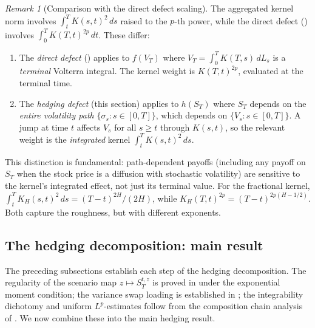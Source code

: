 \documentclass[11pt,a4paper]{article}
\theoremstyle{plain}
\theoremstyle{definition}
\theoremstyle{remark}
\newtheorem{remark}[theorem]{Remark}
\begin{document}
\begin{remark}[Comparison with the direct defect scaling]
\label{rem:comparison}
The aggregated kernel norm involves $\int_t^T K(s,t)^2\,ds$
raised to the $p$-th power, while the direct
defect () involves $\int_0^T K(T,t)^{2p}\,dt$.
These differ:
\begin{enumerate}[label=(\roman*)]
\item The \emph{direct defect} () applies to
  $f(V_T)$ where $V_T = \int_0^T K(T,s)\,dL_s$ is a
  \emph{terminal} Volterra integral.  The kernel weight is
  $K(T,t)^{2p}$, evaluated at the terminal time.
\item The \emph{hedging defect} (this section) applies to
  $h(S_T)$ where $S_T$ depends on the \emph{entire volatility
  path} $\{\sigma_s : s \in [0,T]\}$, which depends on
  $\{V_s : s \in [0,T]\}$.  A jump at time $t$ affects
  $V_s$ for all $s \geq t$ through $K(s,t)$, so the relevant
  weight is the \emph{integrated} kernel $\int_t^T K(s,t)^2\,ds$.
\end{enumerate}
This distinction is fundamental: path-dependent payoffs
(including any payoff on $S_T$ when the stock price is a
diffusion with stochastic volatility) are sensitive to the
kernel's integrated effect, not just its terminal value.
For the fractional kernel, $\int_t^T K_H(s,t)^2\,ds =
(T-t)^{2H}/(2H)$, while $K_H(T,t)^{2p} = (T-t)^{2p(H-1/2)}$.
Both capture the roughness, but with different exponents.
\end{remark}


\subsection{The hedging decomposition: main result}

The preceding subsections establish each step of the
hedging decomposition.  The regularity of the scenario map
$z \mapsto S_T^{t,z}$ is proved in 
under the exponential moment condition; the variance swap
loading is established in ; the
integrability dichotomy and uniform $L^p$-estimates
follow from the composition chain analysis of
.  We now combine these into the
main hedging result.
\end{document}
